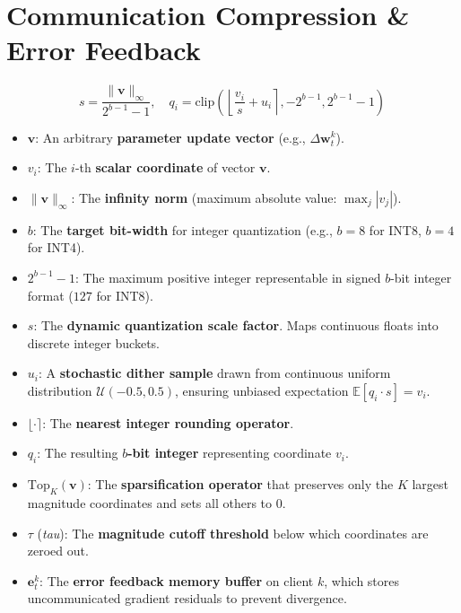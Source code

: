 \documentclass[11pt,a4paper,titlepage]{report}
\begin{document}
\section{Communication Compression \& Error Feedback}
\begin{equation}
    s = \frac{\|\mathbf{v}\|_\infty}{2^{b-1} - 1}, \quad q_i = \text{clip}\left( \left\lfloor \frac{v_i}{s} + u_i \right\rceil, -2^{b-1}, 2^{b-1} - 1 \right)
\end{equation}
\begin{itemize}[leftmargin=*]
    \item $\mathbf{v}$: An arbitrary \textbf{parameter update vector} (e.g., $\Delta\mathbf{w}_t^k$).
    \item $v_i$: The $i$-th \textbf{scalar coordinate} of vector $\mathbf{v}$.
    \item $\|\mathbf{v}\|_\infty$: The \textbf{infinity norm} (maximum absolute value: $\max_j |v_j|$).
    \item $b$: The \textbf{target bit-width} for integer quantization (e.g., $b = 8$ for INT8, $b = 4$ for INT4).
    \item $2^{b-1} - 1$: The maximum positive integer representable in signed $b$-bit integer format ($127$ for INT8).
    \item $s$: The \textbf{dynamic quantization scale factor}. Maps continuous floats into discrete integer buckets.
    \item $u_i$: A \textbf{stochastic dither sample} drawn from continuous uniform distribution $\mathcal{U}(-0.5, 0.5)$, ensuring unbiased expectation $\mathbb{E}[q_i \cdot s] = v_i$.
    \item $\lfloor \cdot \rceil$: The \textbf{nearest integer rounding operator}.
    \item $q_i$: The resulting \textbf{$b$-bit integer} representing coordinate $v_i$.
    \item $\text{Top}_K(\mathbf{v})$: The \textbf{sparsification operator} that preserves only the $K$ largest magnitude coordinates and sets all others to 0.
    \item $\tau$ (\textit{tau}): The \textbf{magnitude cutoff threshold} below which coordinates are zeroed out.
    \item $\mathbf{e}_t^k$: The \textbf{error feedback memory buffer} on client $k$, which stores uncommunicated gradient residuals to prevent divergence.
\end{itemize}
\end{document}
